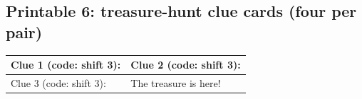 \subsection*{Printable 6: treasure-hunt clue cards (four per pair)}
\begin{center}
\renewcommand{\arraystretch}{2.4}
\begin{tabular}{|p{6.5cm}|p{6.5cm}|}
\hline
Clue 1 (code: shift 3): & Clue 2 (code: shift 3): \\ \hline
Clue 3 (code: shift 3): & The treasure is here! \\ \hline
\end{tabular}
\end{center}
